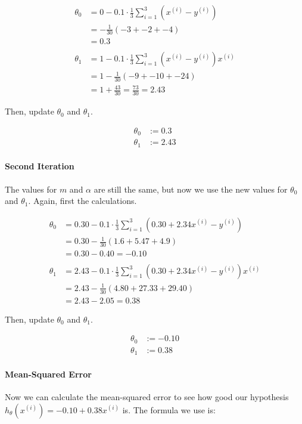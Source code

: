 \documentclass[12pt, a4paper]{article}
\begin{document}
		\begin{align*}
		\theta_0 &= 0 - 0.1 \cdot \frac{1}{3}\sum\limits_{i=1}^3 (x ^{(i)} - y ^{(i)})\\
		&= -\frac{1}{30} (-3 + -2 + -4)\\
		&= 0.3 \\
		\\
		\theta_1&=1-0.1 \cdot \frac{1}{3}\sum\limits_{i=1}^3 (x ^{(i)} - y ^{(i)})x^{(i)}\\
		&=1-\frac{1}{30}(-9+-10+-24)\\
		&=1+\frac{43}{30}=\frac{73}{30}=2.43
		\end{align*}
		
		Then, update $\theta_0$ and $\theta_1$.
		
		\begin{align*}
		\theta_0 &:= 0.3 \\
		\theta_1&:=2.43
		\end{align*}
	
	\paragraph{Second Iteration}
	The values for $m$ and $\alpha$ are still the same, but now we use the new values for $\theta_0$ and $\theta_1$. Again, first the calculations.
	
		\begin{align*}
		\theta_0 &= 0.30 - 0.1 \cdot \frac{1}{3}\sum\limits_{i=1}^3 (0.30+2.34x ^{(i)} - y ^{(i)})\\
		&= 0.30-\frac{1}{30} (1.6+5.47+4.9)\\
		&= 0.30 - 0.40 = -0.10\\
		\\
		\theta_1&=2.43-0.1 \cdot \frac{1}{3}\sum\limits_{i=1}^3 (0.30+2.34x ^{(i)} - y ^{(i)})x^{(i)}\\
		&=2.43-\frac{1}{30}(4.80+27.33+29.40)\\
		&=2.43-2.05=0.38
		\end{align*}
		
		\pagebreak
		Then, update $\theta_0$ and $\theta_1$.
		
		\begin{align*}
		\theta_0 &:= -0.10\\
		\theta_1&:=0.38
		\end{align*}
	
	\paragraph{Mean-Squared Error}
	Now we can calculate the mean-squared error to see how good our hypothesis $h_\theta(x^{(i)}) = -0.10 + 0.38x^{(i)}$ is. The formula we use is:
	
\end{document}
